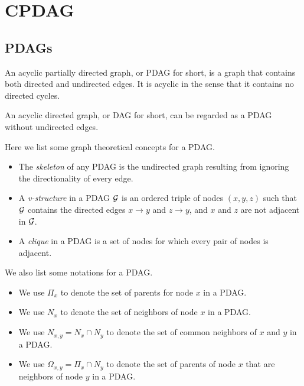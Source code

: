\chapter{CPDAG}

\section{PDAGs}

\begin{definition}[PDAG]
    An acyclic partially directed graph, or PDAG for short, is a graph that contains both directed and undirected edges. It is acyclic in the sense that it contains no directed cycles.
\end{definition}
\begin{remark}
    An acyclic directed graph, or DAG for short, can be regarded as a PDAG without undirected edges.
\end{remark}
Here we list some graph theoretical concepts for a PDAG.
\begin{itemize}
    \item The \textit{skeleton} of any PDAG is the undirected graph resulting from ignoring the directionality of every edge. 
    \item A \textit{v-structure} in a PDAG $\mathcal{G}$ is an ordered triple of nodes $(x,y,z)$ such that $\mathcal{G}$ contains the directed edges $x \rightarrow y$ and $z \rightarrow y$, and $x$ and $z$ are not adjacent in $\mathcal{G}$.
    \item A \textit{clique} in a PDAG is a set of nodes for which every pair of nodes is adjacent.
\end{itemize}
We also list some notations for a PDAG.
\begin{itemize}
    \item We use $\Pi_x$ to denote the set of parents for node $x$ in a PDAG.
    \item We use $N_x$ to denote the set of neighbors of node $x$ in a PDAG.
    \item We use $N_{x,y} = N_x \cap N_y$ to denote the set of common neighbors of $x$ and $y$ in a PDAG.
    \item We use $\Omega_{x,y} = \Pi_x \cap N_y$ to denote the set of parents of node $x$ that are neighbors of node $y$ in a PDAG.
\end{itemize}

